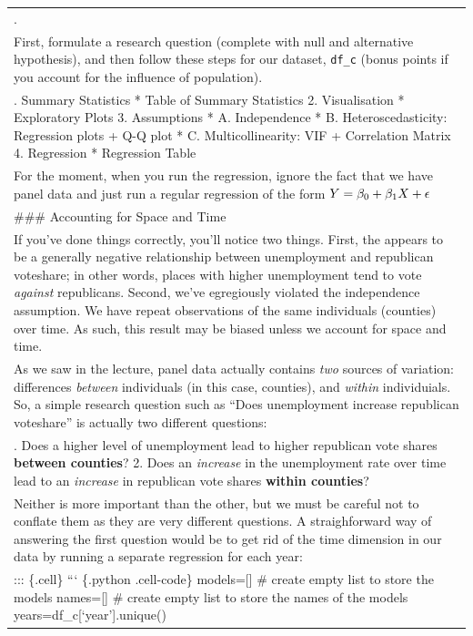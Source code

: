 \documentclass[
  letterpaper,
  DIV=11,
  numbers=noendperiod]{scrreprt}
\begin{document}
\begin{longtable}[]{@{}
  >{\raggedright\arraybackslash}p{}@{}}
{week}. \\
First, formulate a research question (complete with null and alternative
hypothesis), and then follow these steps for our dataset, \texttt{df\_c}
(bonus points if you account for the influence of population). \\
1. Summary Statistics * Table of Summary Statistics 2. Visualisation *
Exploratory Plots 3. Assumptions * A. Independence * B.
Heteroscedasticity: Regression plots + Q-Q plot * C. Multicollinearity:
VIF + Correlation Matrix 4. Regression * Regression Table \\
For the moment, when you run the regression, ignore the fact that we
have panel data and just run a regular regression of the form
\(\huge Y= \beta_0 + \beta_1X+\epsilon \) \\
\#\#\# Accounting for Space and Time \\
If you've done things correctly, you'll notice two things. First, the
appears to be a generally negative relationship between unemployment and
republican voteshare; in other words, places with higher unemployment
tend to vote \emph{against} republicans. Second, we've egregiously
violated the independence assumption. We have repeat observations of the
same individuals (counties) over time. As such, this result may be
biased unless we account for space and time. \\
As we saw in the lecture, panel data actually contains \emph{two}
sources of variation: differences \emph{between} individuals (in this
case, counties), and \emph{within} individuials. So, a simple research
question such as ``Does unemployment increase republican voteshare'' is
actually two different questions: \\
1. Does a higher level of unemployment lead to higher republican vote
shares \textbf{between counties}? 2. Does an \emph{increase} in the
unemployment rate over time lead to an \emph{increase} in republican
vote shares \textbf{within counties}? \\
Neither is more important than the other, but we must be careful not to
conflate them as they are very different questions. A straighforward way
of answering the first question would be to get rid of the time
dimension in our data by running a separate regression for each year: \\
::: \{.cell\} ``` \{.python .cell-code\} models={[}{]} \# create empty
list to store the models names={[}{]} \# create empty list to store the
names of the models years=df\_c{[}`year'{]}.unique() \\

\end{longtable}
\end{document}
